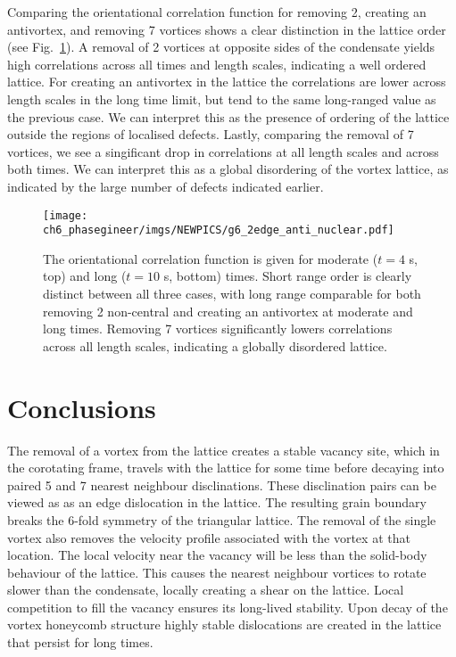 Comparing the orientational correlation function for removing 2, creating an antivortex, and removing 7 vortices shows a clear distinction in the lattice order (see Fig.~\ref{fig:g6_2edge_anti_nuclear}). A removal of 2 vortices at opposite sides of the condensate yields high correlations across all times and length scales, indicating a well ordered lattice. For creating an antivortex in the lattice the correlations are lower across length scales in the long time limit, but tend to the same long-ranged value as the previous case. We can interpret this as the presence of ordering of the lattice outside the regions of localised defects. Lastly, comparing the removal of 7 vortices, we see a singificant drop in correlations at all length scales and across both times. We can interpret this as a global disordering of the vortex lattice, as indicated by the large number of defects indicated earlier.

\begin{figure}[H] \centering
    \texttt{[image: ch6\_phasegineer/imgs/NEWPICS/g6\_2edge\_anti\_nuclear.pdf]}
    \caption{The orientational correlation function is given for moderate ($t=4$ s, top) and long ($t=10$ s, bottom) times. Short range order is clearly distinct between all three cases, with long range comparable for both removing 2 non-central and creating an antivortex at moderate and long times. Removing 7 vortices significantly lowers correlations across all length scales, indicating a globally disordered lattice.}\label{fig:g6_2edge_anti_nuclear}
\end{figure}

\section{Conclusions}\label{sec:Conclusions}

The removal of a vortex from the lattice creates a stable vacancy site, which in the corotating frame, travels with the lattice for some time before decaying into paired 5 and 7 nearest neighbour disclinations. These disclination pairs can be viewed as as an edge dislocation in the lattice. The resulting grain boundary breaks the 6-fold symmetry of the triangular lattice. The removal of the single vortex also removes the velocity profile associated with the vortex at that location. The local velocity near the vacancy will be less than the solid-body behaviour of the lattice. This causes the nearest neighbour vortices to rotate slower than the condensate, locally creating a shear on the lattice. Local competition to fill the vacancy ensures its long-lived stability. Upon decay of the vortex honeycomb structure highly stable dislocations are created in the lattice that persist for long times.

